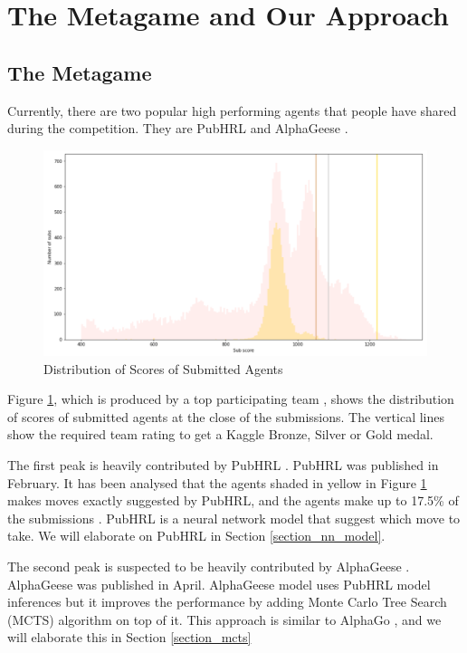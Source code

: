 \section{The Metagame and Our Approach}

\subsection{The Metagame}
\label{subsection_metagame}

Currently, there are two popular high performing agents that people have shared during the competition. They are PubHRL \cite{notebook_pubhrl} and AlphaGeese \cite{notebook_alphageese_baseline}.

\begin{figure}[h]
\centering
\includegraphics[width=\textwidth]{images/metagame.png}
\caption{Distribution of Scores of Submitted Agents}
\label{figure_metagame}
\end{figure}

Figure \ref{figure_metagame}, which is produced by a top participating team \cite{comment_agent_score_distribution}, shows the distribution of scores of submitted agents at the close of the submissions. The vertical lines show the required team rating to get a Kaggle Bronze, Silver or Gold medal.

The first peak is heavily contributed by PubHRL \cite{notebook_pubhrl}. PubHRL was published in February. It has been analysed that the agents shaded in yellow in Figure \ref{figure_metagame} makes moves exactly suggested by PubHRL, and the agents make up to 17.5\% of the submissions \cite{comment_agent_score_distribution}. PubHRL is a neural network model that suggest which move to take. We will elaborate on PubHRL in Section \ref{section_nn_model}.

The second peak is suspected to be heavily contributed by AlphaGeese \cite{notebook_alphageese_baseline}. AlphaGeese was published in April. AlphaGeese model uses PubHRL model inferences but it improves the performance by adding Monte Carlo Tree Search (MCTS) algorithm on top of it. This approach is similar to AlphaGo \cite{paper_alphago}, and we will elaborate this in Section \ref{section_mcts}

